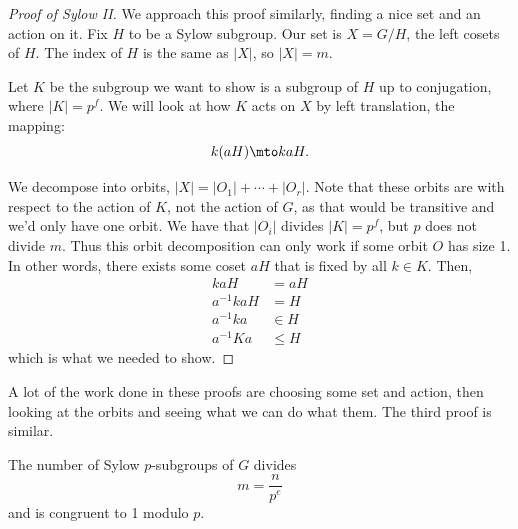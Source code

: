 \begin{proof}[Proof of Sylow II]
    We approach this proof similarly, finding a nice set and an action on it.
    Fix $H$ to be a Sylow subgroup.
    Our set is $X = G/H$, the left cosets of $H$. 
    The index of $H$ is the same as $|X|$, so $|X| = m$. 
    
    Let $K$ be the subgroup we want to show is a subgroup of $H$ up to conjugation, where $|K| = p^f$.
    We will look at how $K$ acts on $X$ by left translation, the mapping: $$k(aH) \mto kaH.$$

    We decompose into orbits, $|X| = |O_1| + \cdots + |O_r|$. 
    Note that these orbits are with respect to the action of $K$, not the action of $G$, as that would be transitive and we'd only have one orbit.
    We have that $|O_i|$ divides $|K| = p^f$, but $p$ does not divide $m$. 
    Thus this orbit decomposition can only work if some orbit $O$ has size 1. 
    In other words, there exists some coset $aH$ that is fixed by all $k \in K$. 
    Then,
    \begin{align*}
        kaH &= aH\\
        a^{-1}kaH &= H \\
        a^{-1} ka &\in H \\
        a^{-1}Ka &\leq H
    \end{align*}
    which is what we needed to show.
\end{proof}
A lot of the work done in these proofs are choosing some set and action, then looking at the orbits and seeing what we can do what them. The third proof is similar. 


\begin{theorem}
The number of Sylow $p$-subgroups of $G$ divides \[m = \frac{n}{p^e}\] and is congruent to 1 modulo $p.$
\end{theorem}


